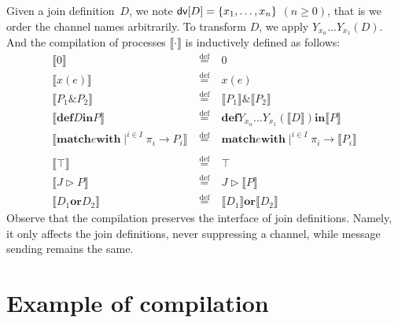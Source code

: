 \documentclass{LMCS}
\renewcommand{\exp}{e}
\newcommand{\pt}{\pi}
\newcommand{\kwd}[1]{\ensuremath{\mathbf{#1}}}
\newcommand{\prefix}[1]{\mathopen{}\mathrel{\kwd {#1}}}
\newcommand{\infix}[1]{\mathrel{\kwd {#1}}}
\newcommand{\set}[1]{\{#1\}}
\renewcommand{\_}{\mathord{\rule[-.25ex]{1ex}{.15ex}}}
\newcommand{\nullp}{0}
\newcommand{\defineas}{\;\stackrel{\mathrm{def}}=\;}
\newcommand{\C}[1]{\llbracket#1\rrbracket}
\newcommand{\para}[2]{#1\mathop{\&}#2}
\newcommand{\dis}[2]{#1\infix{or}#2}
\newcommand{\define}[2]{\prefix{def} #1 \infix{in} #2}
\newcommand{\matchthree}[3]{\prefix{match} #1 \infix{with} \mid^{i
    \in I} #2_i \rightarrow #3_i}
\newcommand{\matchC}[3]{\prefix{match} #1 \infix{with} \mid^{i
    \in I} #2_i \rightarrow \C{#3_i}}
\newcommand{\reaction}[2]{#1 \triangleright #2}
\newcommand{\dv}[1]{\mbox{\sf dv}[#1]}
\begin{document}
Given a join definition~$D$, we note $\dv{D} = \set{x_1, \ldots, x_n}$ $(n
\geq 0)$, that is we order the channel names arbitrarily.
To transform $D$, we apply $Y_{x_n} \ldots Y_{x_1}(D)$. And the compilation of
processes $\C{\cdot}$ is inductively defined as follows: $$
\begin{array}{rcl}
\C{\nullp} & \defineas & \nullp \\
\C{x(\exp)} & \defineas & x(\exp) \\
\C{\para{P_1}{P_2}} & \defineas & \para{\C{P_1}}{\C{P_2}}\\
\C{\define{D}{P}} & \defineas & \define{Y_{x_n}\ldots Y_{x_1}(\C{D})}{\C{P}} \\
\C{\matchthree{\exp}{\pt}{P}} & \defineas & \matchC{\exp}{\pt}{P}\\
\\
\C{\top} & \defineas & \top \\
\C{\reaction{J}{P}} & \defineas & \reaction{J}{\C{P}} \\
\C{\dis{D_1}{D_2}} & \defineas & \dis{\C{D_1}}{\C{D_2}}
\end{array}
$$
Observe that the compilation preserves the interface of join
definitions. Namely, it only affects the join definitions, never
suppressing a channel, while message sending remains the same.

\section{Example of compilation}
\label{sec.example}
\end{document}
